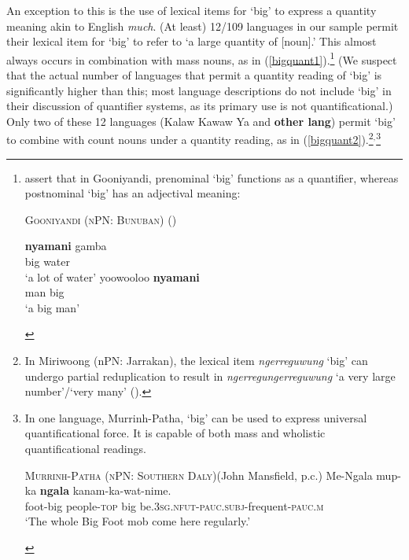 \documentclass[12pt,egregdoesnotlikesansseriftitles]{scrartcl}
\begin{document}
An exception to this is the use of lexical items for `big' to express a quantity meaning akin to English \textit{much}. (At least) 12/109 languages in our sample permit their lexical item for `big' to refer to `a large quantity of [noun].' This almost always occurs in combination with mass nouns, as in (\ref{bigquant1}).\footnote{\citet[37]{louagieverstraete16} assert that in Gooniyandi, prenominal `big' functions as a quantifier, whereas postnominal `big' has an adjectival meaning:
    \vspace{-2mm}
    \begin{exe}
      \ex  \textsc{Gooniyandi (nPN: Bunuban)} \hfill(\citealt{mcgregor90})
      \begin{xlist}
      \begin{multicols}{2}
        \ex \gll \textbf{nyamani} gamba\\
        big water \\
        \glt `a lot of water'%
        \ex \gll yoowooloo \textbf{nyamani} \\
        man big \\
        \glt `a big man' %
    \end{multicols}
      \end{xlist}
    \end{exe}
  } (We suspect that the actual number of languages that permit a quantity reading of `big' is significantly higher than this; most language descriptions do not include `big' in their discussion of quantifier systems, as its primary use is not quantificational.) Only two of these 12 languages (Kalaw Kawaw Ya and \textbf{other lang}) permit `big' to combine with count nouns under a quantity reading, as in (\ref{bigquant2}).\footnote{
  In Miriwoong (nPN: Jarrakan), the lexical item \textit{ngerreguwung} `big' can undergo partial reduplication to result in \textit{ngerregungerreguwung} `a very large number'/`very many' (\citealt[43]{kofod78}).
  }$^{,}$\footnote{In one language, Murrinh-Patha, `big' can be used to express universal quantificational force. It is capable of both mass and wholistic quantificational readings.
  \vspace{-2mm}
\begin{exe}
\ex  \textsc{Murrinh-Patha (nPN: Southern Daly)}\hfill (John Mansfield, p.c.)
\gll Me-Ngala mup-ka \textbf{ngala} kanam-ka-wat-nime.\\
foot-big people-\textsc{top} big be.3\textsc{sg.nfut-pauc.subj}-frequent-\textsc{pauc.m}\\
`The whole Big Foot mob come here regularly.'
\end{exe}
}
\end{document}
